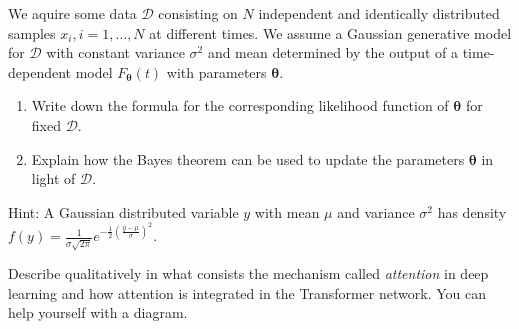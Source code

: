 \documentclass[11pt]{article}
\newcounter{marks}
\begin{document}
\begin{list}{{\bf Question :}}
\item
{}
\addtocounter{marks}{1}
We aquire some data $\mathcal{D}$ consisting on $N$ independent and identically distributed samples $x_i, i = 1,\hdots,N$ at different times.
We assume a Gaussian generative model for $\mathcal{D}$ with constant variance $\sigma^2$ and mean determined by the output of a time-dependent model $F_{\boldsymbol{\theta}}(t)$ with parameters $\boldsymbol{\theta}$.
\vspace{-.3cm}
\begin{enumerate}
\item Write down the formula for the corresponding likelihood function of $\boldsymbol{\theta}$ for fixed $\mathcal{D}$.
\item Explain how the Bayes theorem can be used to update the parameters $\boldsymbol{\theta}$ in light of $\mathcal{D}$.\\
\end{enumerate}
\vspace{-.6cm}
Hint: A Gaussian distributed variable $y$ with mean $\mu$ and variance $\sigma^2$ has density $f(y)=\frac{1}{\sigma\sqrt{2\pi}}e^{-\frac{1}{2}\left(\frac{y-\mu}{\sigma}\right)^2}$.

\framebox[16cm][l]{ 
\parbox{15.9cm}{
\vspace*{5cm}
}}

\item
{}
\addtocounter{marks}{2}
Describe qualitatively in what consists the mechanism called \emph{attention} in deep learning and how attention is integrated in the Transformer network.
You can help yourself with a diagram.

\framebox[16cm][l]{ 
\parbox{15.9cm}{
\vspace*{7.5cm}
}}


\end{list}
\end{document}

